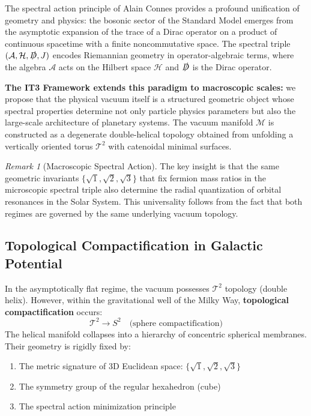 \documentclass[11pt,a4paper]{article}
\theoremstyle{remark}
\newtheorem{remark}[theorem]{Remark}
\newcommand{\cT}{\mathcal{T}}
\newcommand{\cH}{\mathcal{H}}
\newcommand{\cA}{\mathcal{A}}
\newcommand{\cM}{\mathcal{M}}
\newcommand{\slashedD}{\slashed{D}}
\begin{document}
The spectral action principle of Alain Connes \cite{connes1994,chamseddine1997} provides a profound unification of geometry and physics: the bosonic sector of the Standard Model emerges from the asymptotic expansion of the trace of a Dirac operator on a product of continuous spacetime with a finite noncommutative space. The spectral triple $(\cA, \cH, \slashedD, J)$ encodes Riemannian geometry in operator-algebraic terms, where the algebra $\cA$ acts on the Hilbert space $\cH$ and $\slashedD$ is the Dirac operator.

\textbf{The IT3 Framework extends this paradigm to macroscopic scales:} we propose that the physical vacuum itself is a structured geometric object whose spectral properties determine not only particle physics parameters but also the large-scale architecture of planetary systems. The vacuum manifold $\cM$ is constructed as a degenerate double-helical topology obtained from unfolding a vertically oriented torus $\cT^2$ with catenoidal minimal surfaces.

\begin{remark}[Macroscopic Spectral Action]
The key insight is that the same geometric invariants $\{\sqrt{1}, \sqrt{2}, \sqrt{3}\}$ that fix fermion mass ratios in the microscopic spectral triple also determine the radial quantization of orbital resonances in the Solar System. This universality follows from the fact that both regimes are governed by the same underlying vacuum topology.
\end{remark}

\subsection{Topological Compactification in Galactic Potential}

In the asymptotically flat regime, the vacuum possesses $\cT^2$ topology (double helix). However, within the gravitational well of the Milky Way, \textbf{topological compactification} occurs:
\begin{equation}
    \cT^2 \longrightarrow S^2 \quad \text{(sphere compactification)}
\end{equation}
The helical manifold collapses into a hierarchy of concentric spherical membranes. Their geometry is rigidly fixed by:
\begin{enumerate}
    \item The metric signature of 3D Euclidean space: $\{\sqrt{1}, \sqrt{2}, \sqrt{3}\}$
    \item The symmetry group of the regular hexahedron (cube)
    \item The spectral action minimization principle
\end{enumerate}
\end{document}
